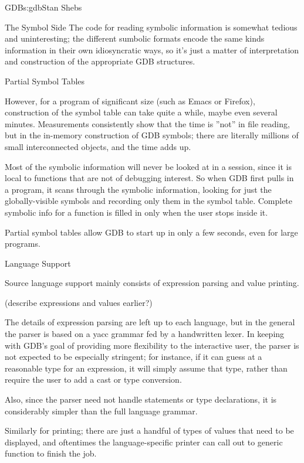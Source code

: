 \begin{aosachapter}{GDB}{s:gdb}{Stan Shebs}
\begin{aosasect1}{The Symbol Side}
The code for reading symbolic information is somewhat tedious and
uninteresting; the different sumbolic formats encode the same kinds
information in their own idiosyncratic ways, so it's just a matter of
interpretation and construction of the appropriate GDB structures.

\end{aosasect1}

\begin{aosasect1}{Partial Symbol Tables}

However, for a program of significant size (such as Emacs or Firefox),
construction of the symbol table can take quite a while, maybe even
several minutes.  Measurements consistently show that the time is
''not'' in file reading, but in the in-memory construction of GDB
symbols; there are literally millions of small interconnected objects,
and the time adds up.

Most of the symbolic information will never be looked at in a session,
since it is local to functions that are not of debugging interest.  So
when GDB first pulls in a program, it scans through the symbolic
information, looking for just the globally-visible symbols and
recording only them in the symbol table.  Complete symbolic info for a
function is filled in only when the user stops inside it.

Partial symbol tables allow GDB to start up in only a few seconds, even
for large programs.

\end{aosasect1}

\begin{aosasect1}{Language Support}

Source language support mainly consists of expression parsing and value
printing.

(describe expressions and values earlier?)

The details of expression parsing are left up to each language, but in
the general the parser is based on a yacc grammar fed by a handwritten
lexer.  In keeping with GDB's goal of providing more flexibility to the
interactive user, the parser is not expected to be especially stringent;
for instance, if it can guess at a reasonable type for an expression,
it will simply assume that type, rather than require the user to add
a cast or type conversion.

Also, since the parser need not handle statements or type declarations,
it is considerably simpler than the full language grammar.

Similarly for printing; there are just a handful of types of values that
need to be displayed, and oftentimes the language-specific printer can
call out to generic function to finish the job.


\end{aosasect1}
\end{aosachapter}
